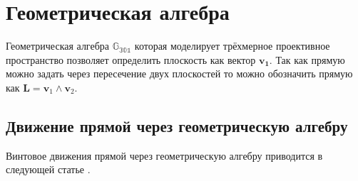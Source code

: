 
  \section{Геометрическая алгебра}

  Геометрическая алгебра $\mathbb{G_{301}}$ которая моделирует трёхмерное проективное пространство позволяет определить плоскость 
  как вектор $\mathbf{v_1}$. Так как прямую можно задать через пересечение двух плоскостей то можно
  обозначить прямую как $\mathbf{L} = \mathbf{v}_1 \wedge \mathbf{v}_2$.

  \subsection{Движение прямой через геометрическую алгебру}
  Винтовое движения прямой через геометрическую алгебру приводится в следующей статье \autocite{ruheGeometricCliffordAlgebra2023}. 





